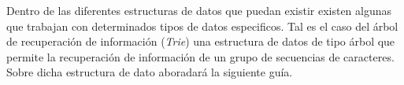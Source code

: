 Dentro de las diferentes estructuras de datos que puedan existir existen algunas que trabajan con determinados tipos de datos especificos. Tal es el caso del árbol de recuperación de información (\emph{Trie}) una estructura de datos de tipo árbol que permite la recuperación de información de un grupo de secuencias de caracteres. Sobre dicha estructura de dato aboradará la siguiente guía.